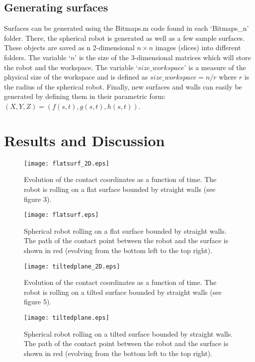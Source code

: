 \documentclass[journal]{IEEEtran}
\begin{document}
\subsection{Generating surfaces}
Surfaces can be generated using the Bitmaps.m code found in each `Bitmaps\_n' folder. There, the spherical robot is generated as well as a few sample surfaces. These objects are saved as n 2-dimensional $n\times n$ images (slices) into different folders. The variable `$n$' is the size of the 3-dimensional matrices which will store the robot and the workspace. The variable `$size\_workspace$' is a measure of the physical size of the workspace and is defined as $size\_workspace = n/r$ where $r$ is the radius of the spherical robot. Finally, new surfaces and walls can easily be generated by defining them in their parametric form: $(X,Y,Z) = (f(s,t),g(s,t),h(s,t))$.

\section{Results and Discussion}

\begin{figure}
\centering
    \texttt{[image: flatsurf\_2D.eps]}
    \caption{Evolution of the contact coordinates as a function of time. The robot is rolling on a flat surface bounded by straight walls (see figure 3).}
    \label{fig:flatsurf2D}
\end{figure}
\begin{figure}
\centering
    \texttt{[image: flatsurf.eps]}
    \caption{Spherical robot rolling on a flat surface bounded by straight walls. The path of the contact point between the robot and the surface is shown in red (evolving from the bottom left to the top right).}
    \label{fig:flatsurf3D}
\end{figure}

\begin{figure}
\centering
    \texttt{[image: tiltedplane\_2D.eps]}
    \caption{Evolution of the contact coordinates as a function of time. The robot is rolling on a tilted surface bounded by straight walls (see figure 5).}
    \label{fig:tiltedplane2D}
\end{figure}
\begin{figure}
\centering
    \texttt{[image: tiltedplane.eps]}
    \caption{Spherical robot rolling on a tilted surface bounded by straight walls. The path of the contact point between the robot and the surface is shown in red (evolving from the bottom left to the top right).}
    \label{fig:tiltedplane3D}
\end{figure}
\end{document}
